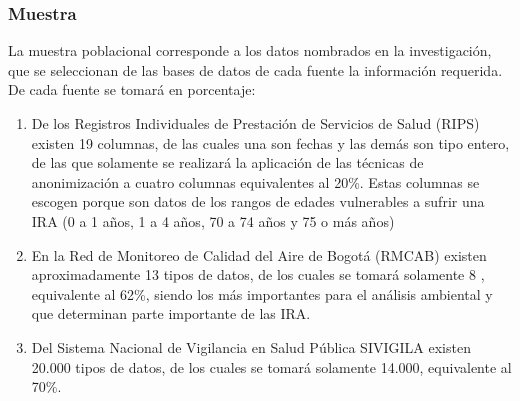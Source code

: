 \documentclass[a4paper,openright,12pt]{book}
\theoremstyle{definition}
\theoremstyle{remark}
\begin{document}
        \subsubsection{Muestra}
        La muestra poblacional corresponde a  los datos nombrados en la investigación, que se seleccionan de las bases de datos de cada fuente la información requerida. De cada fuente se tomará en porcentaje:
        \begin{enumerate}
			\item De los Registros Individuales de Prestación de Servicios de Salud (RIPS) existen 19 columnas, de las cuales una son fechas y las demás son tipo entero, de las que solamente se realizará la aplicación de las técnicas de anonimización a cuatro columnas equivalentes al 20\%. Estas columnas se escogen porque son datos de los rangos de edades vulnerables a sufrir una IRA (0 a 1 años, 1 a 4 años, 70 a 74 años y 75 o más años)
            \item En la Red de Monitoreo de Calidad del Aire de Bogotá (RMCAB) existen aproximadamente 13 tipos de datos, de los cuales se tomará solamente 8 , equivalente al 62\%, siendo los más importantes para el análisis ambiental y que determinan parte importante de las IRA.
            \item Del Sistema Nacional de Vigilancia en Salud Pública SIVIGILA existen 20.000 tipos de datos, de los cuales se tomará solamente 14.000, equivalente al 70\%.
		\end{enumerate}
        
\end{document}
